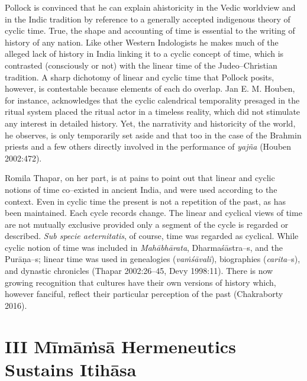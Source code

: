 Pollock is convinced that he can explain ahistoricity in the Vedic worldview and in the Indic tradition by reference to a generally accepted indigenous theory of cyclic time. True, the shape and accounting of time is essential to the writing of history of any nation. Like other Western Indologists he makes much of the alleged lack of history in India linking it to a cyclic concept of time, which is contrasted (consciously or not) with the linear time of the Judeo–Christian tradition. A sharp dichotomy of linear and cyclic time that Pollock posits, however, is contestable because elements of each do overlap. Jan E. M. Houben, for instance, acknowledges that the cyclic calendrical temporality presaged in the ritual system placed the ritual actor in a timeless reality, which did not stimulate any interest in detailed history. Yet, the narrativity and historicity of the world, he observes, is only temporarily set aside and that too in the case of the Brahmin priests and a few others directly involved in the performance of \textit{yajña} (Houben 2002:472).

Romila Thapar, on her part, is at pains to point out that linear and cyclic notions of time co–existed in ancient India, and were used according to the context. Even in cyclic time  the present is not a repetition of the past, as has been maintained. Each cycle records change. The linear and cyclical views of time are not mutually exclusive provided only a segment of the cycle is regarded or described. \textit{Sub specie aeternitatis}, of course, time was regarded as cyclical. While cyclic notion of time was included in \textit{Mahābhārata}, Dharmaśāstra–s, and the Purāṇa–s; linear time was used in genealogies (\textit{vaṁśāvali}), biographies (\textit{carita}–s), and dynastic chronicles (Thapar 2002:26–45, Devy 1998:11). There is now growing recognition that cultures have their own versions of history which, however fanciful, reflect their particular perception of the past (Chakraborty 2016).


\section*{III Mīmāṁsā Hermeneutics Sustains Itihāsa}


